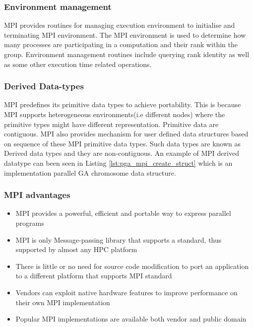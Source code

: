 \subsubsection{Environment management}
MPI provides routines for managing execution environment to initialise and terminating MPI environment. The MPI environment is used to determine how many processes are participating in a computation and their rank within the group\citep{Gropp:96}. Environment management routines include querying rank identity as well as some other execution time related operations\citep{Barney:16-mpi}.

\subsubsection{Derived Data-types}
MPI predefines its primitive data types to achieve portability. This is because MPI supports heterogeneous environments(i.e different nodes) where the primitive types might have different representation\citep{mpi-forum:type-match}. Primitive data are contiguous. MPI also provides mechanism for user defined data structures based on sequence of these MPI primitive data types. Such data types are known as Derived data types and they are non-contiguous\citep{Barney:16-mpi}. An example of MPI derived datatype can been seen in Listing \ref{lst:pga_mpi_create_struct} which is an implementation parallel GA chromosome data structure.

\subsubsection{MPI advantages}
\begin{itemize}
	\item MPI provides a powerful, efficient and portable way to express parallel programs
	\item MPI is only Message-passing library that supports a standard, thus supported by almost any HPC platform
	\item There is little or no need for source code modification to port an application to a different platform that supports MPI standard
	\item Vendors can exploit native hardware features to improve performance on their own MPI implementation
	\item Popular MPI implementations are available both vendor and public domain
\end{itemize}
\citep{Barney:16-mpi}
